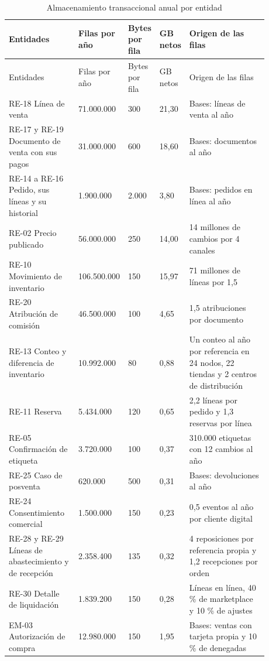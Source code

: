\documentclass[11pt]{article}
\begin{document}
\begin{longtable}{@{}p{0.275\linewidth}p{0.109\linewidth}p{0.085\linewidth}p{0.095\linewidth}p{0.313\linewidth}@{}}
\caption{Almacenamiento transaccional anual por entidad}\label{tab:almacenamiento_a}\\
\toprule Entidades & Filas por año & Bytes por fila & GB netos & Origen de las filas \\
\midrule\endfirsthead
\toprule Entidades & Filas por año & Bytes por fila & GB netos & Origen de las filas \\
\midrule\endhead\bottomrule\endlastfoot
RE-18 Línea de venta & 71.000.000 & 300 & 21,30 & Bases: líneas de venta al año \\
RE-17 y RE-19 Documento de venta con sus pagos & 31.000.000 & 600 & 18,60 & Bases: documentos al año \\
RE-14 a RE-16 Pedido, sus líneas y su historial & 1.900.000 & 2.000 & 3,80 & Bases: pedidos en línea al año \\
RE-02 Precio publicado & 56.000.000 & 250 & 14,00 & 14 millones de cambios por 4 canales \\
RE-10 Movimiento de inventario & 106.500.000 & 150 & 15,97 & 71 millones de líneas por 1,5 \\
RE-20 Atribución de comisión & 46.500.000 & 100 & 4,65 & 1,5 atribuciones por documento \\
RE-13 Conteo y diferencia de inventario & 10.992.000 & 80 & 0,88 & Un conteo al año por referencia en 24 nodos, 22 tiendas y 2 centros de distribución \\
RE-11 Reserva & 5.434.000 & 120 & 0,65 & 2,2 líneas por pedido y 1,3 reservas por línea \\
RE-05 Confirmación de etiqueta & 3.720.000 & 100 & 0,37 & 310.000 etiquetas con 12 cambios al año \\
RE-25 Caso de posventa & 620.000 & 500 & 0,31 & Bases: devoluciones al año \\
RE-24 Consentimiento comercial & 1.500.000 & 150 & 0,23 & 0,5 eventos al año por cliente digital \\
RE-28 y RE-29 Líneas de abastecimiento y de recepción & 2.358.400 & 135 & 0,32 & 4 reposiciones por referencia propia y 1,2 recepciones por orden \\
RE-30 Detalle de liquidación & 1.839.200 & 150 & 0,28 & Líneas en línea, 40 \% de marketplace y 10 \% de ajustes \\
EM-03 Autorización de compra & 12.980.000 & 150 & 1,95 & Bases: ventas con tarjeta propia y 10 \% de denegadas \\

\end{longtable}
\end{document}
